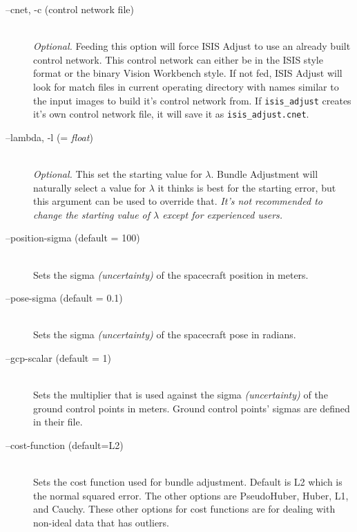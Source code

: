 \begin{description}

\item[--cnet, -c \textnormal{\small{(control network file)}}] \hfill \\

  \emph{Optional.} Feeding this option will force ISIS Adjust to use
  an already built control network. This control network can either be
  in the ISIS style format or the binary Vision Workbench style. If
  not fed, ISIS Adjust will look for match files in current operating
  directory with names similar to the input images to build it's
  control network from. If \texttt{isis\_adjust} creates it's own
  control network file, it will save it as \verb=isis_adjust.cnet=.

\item[--lambda, -l \textnormal{\small{(= \emph{float})}}] \hfill \\

  \emph{Optional.} This set the starting value for $\lambda$. Bundle
  Adjustment will naturally select a value for $\lambda$ it thinks is
  best for the starting error, but this argument can be used to
  override that. \emph{It's not recommended to change the starting
    value of $\lambda$ except for experienced users.}

\item[--position-sigma \textnormal{\small{(default = 100)}}] \hfill \\

  Sets the sigma \emph{(uncertainty)} of the spacecraft position in
  meters.

\item[--pose-sigma \textnormal{\small{(default = 0.1)}}] \hfill \\

  Sets the sigma \emph{(uncertainty)} of the spacecraft pose in
  radians.

\item[--gcp-scalar \textnormal{\small{(default = 1)}}] \hfill \\

  Sets the multiplier that is used against the sigma
  \emph{(uncertainty)} of the ground control points in meters. Ground
  control points' sigmas are defined in their file.

\item[--cost-function \textnormal{\small{(default=L2)}}] \hfill \\

  Sets the cost function used for bundle adjustment. Default is L2
  which is the normal squared error. The other options are
  PseudoHuber, Huber, L1, and Cauchy. These other options for cost
  functions are for dealing with non-ideal data that has outliers.


\end{description}
